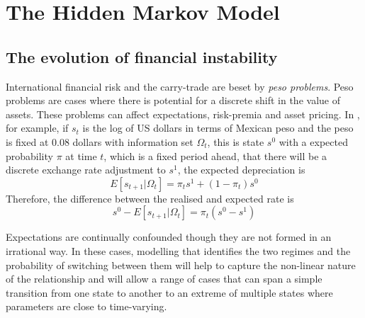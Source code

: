 \documentclass[12pt, a4paper, oneside]{article}\usepackage[]{graphicx}\usepackage[]{color}
\begin{document}

\section{The Hidden Markov Model}\label{secref:HMM}
\subsection{The evolution of financial instability}
International financial risk and the carry-trade are beset by \emph{peso problems}. Peso problems are cases where there is  potential for a discrete shift in the value of assets.  These problems can affect expectations, risk-premia and asset pricing. In \citet{evans199621}, for example, if $s_t$ is the log of US dollars in terms of Mexican peso and the peso is fixed at 0.08 dollars with information set $\Omega_t$, this is state $s^0$ with a expected probability $\pi$ at time $t$, which is a fixed period ahead, that there will be a discrete exchange rate adjustment to $s^1$, the expected depreciation is 
\begin{equation}
E[s_{t+1}|\Omega_t] = \pi_ts^1 + (1 - \pi_t)s^0
\end{equation}
Therefore, the difference between the realised and expected rate is 
\begin{equation}
s^0 - E[s_{t+1}|\Omega_t] = \pi_t(s^0 - s^1)
\end{equation}


Expectations are continually confounded though they are not formed in an irrational way. In these cases, modelling that identifies the two regimes and the probability of switching between them will help to capture the non-linear nature of the relationship and will allow a range of cases that can span a simple transition from one state to another to an extreme of multiple states where parameters are close to time-varying.  
\end{document}
